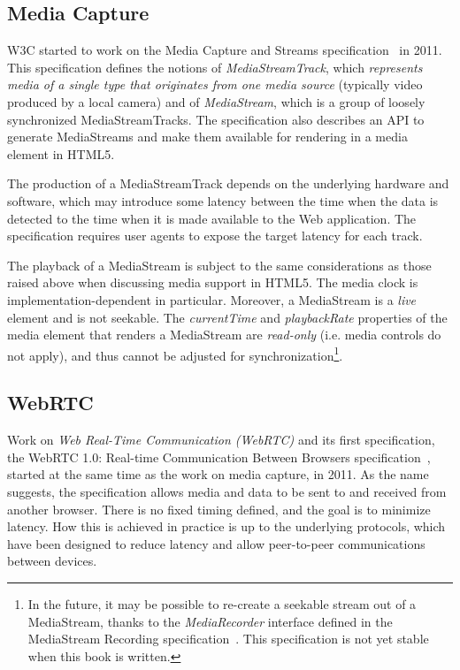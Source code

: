 \documentclass[graybox]{svmult}
\begin{document}
\subsection{Media Capture}
\label{sec:capture}

W3C started to work on the Media Capture and Streams
specification~\cite{capture} in 2011. This specification defines the notions
of \emph{MediaStreamTrack}, which \emph{represents media of a single type that
originates from one media source} (typically video produced by a local camera)
and of \emph{MediaStream}, which is a group of loosely synchronized
MediaStreamTracks. The specification also describes an API to generate
MediaStreams and make them available for rendering in a media element in
HTML5.

The production of a MediaStreamTrack depends on the underlying hardware and
software, which may introduce some latency between the time when the data is
detected to the time when it is made available to the Web application. The
specification requires user agents to expose the target latency for each
track.

The playback of a MediaStream is subject to the same considerations as those
raised above when discussing media support in HTML5. The media clock is
implementation-dependent in particular. Moreover, a MediaStream is a
\emph{live} element and is not seekable. The \emph{currentTime} and
\emph{playbackRate} properties of the media element that renders a MediaStream
are \emph{read-only} (i.e. media controls do not apply), and thus cannot be
adjusted for synchronization\footnote{In the future, it may be possible to re-create 
a seekable stream out of a MediaStream, thanks to the
\emph{MediaRecorder} interface defined in the MediaStream Recording
specification~\cite{mediastreamrecording}. This specification is not yet stable when this book is
written.}.


\subsection{WebRTC}
\label{sec:webrtc}

Work on \emph{Web Real-Time Communication (WebRTC)} and its first specification, 
the WebRTC 1.0: Real-time Communication Between Browsers
specification~\cite{webrtc}, started at the same time as the work on media
capture, in 2011. As the name suggests, the specification allows media and
data to be sent to and received from another browser. There is no fixed timing
defined, and the goal is to minimize latency. How this is achieved in practice
is up to the underlying protocols, which have been designed to reduce latency
and allow peer-to-peer communications between devices.
\end{document}
